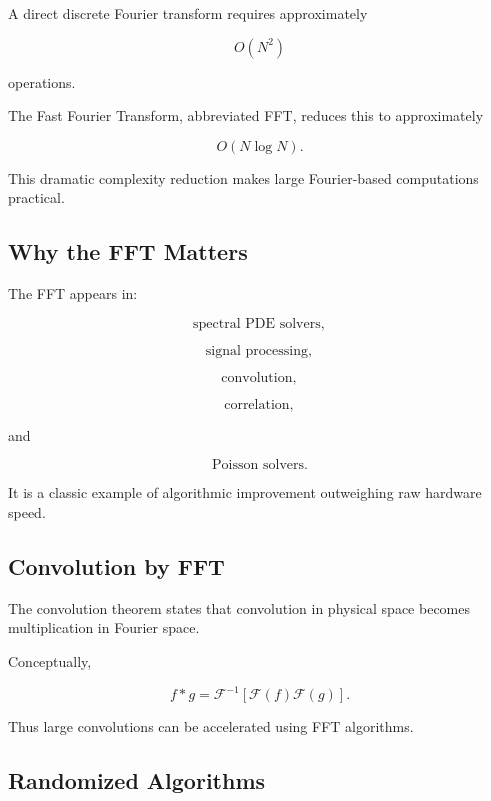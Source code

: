 A direct discrete Fourier transform requires approximately

\[
\boxed{
O(N^2)
}
\]

operations.

The Fast Fourier Transform, abbreviated FFT, reduces this to approximately

\[
\boxed{
O(N\log N).
}
\]

This dramatic complexity reduction makes large Fourier-based computations
practical.

\subsection{Why the FFT Matters}
\label{subsec:why-fft-matters}

The FFT appears in:

\[
\boxed{
\text{spectral PDE solvers},
}
\]

\[
\boxed{
\text{signal processing},
}
\]

\[
\boxed{
\text{convolution},
}
\]

\[
\boxed{
\text{correlation},
}
\]

and

\[
\boxed{
\text{Poisson solvers}.
}
\]

It is a classic example of algorithmic improvement outweighing raw
hardware speed.

\subsection{Convolution by FFT}
\label{subsec:fft-convolution}

The convolution theorem states that convolution in physical space becomes
multiplication in Fourier space.

Conceptually,

\[
\boxed{
f*g
=
\mathcal{F}^{-1}
\left[
\mathcal{F}(f)
\mathcal{F}(g)
\right].
}
\]

Thus large convolutions can be accelerated using FFT algorithms.

\subsection{Randomized Algorithms}
\label{subsec:scientific-randomized-algorithms}


